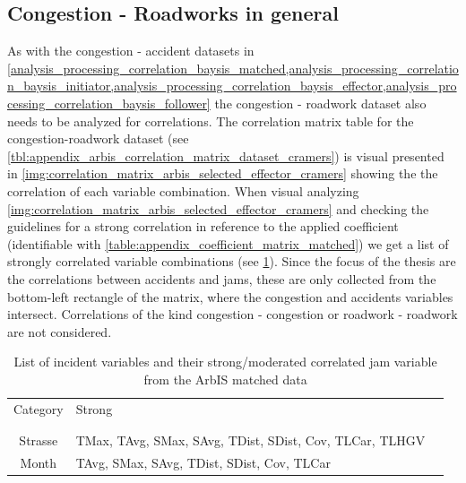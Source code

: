 \subsection{Congestion - Roadworks in general}
\label{analysis_processing_correlation_arbis_matched}
As with the congestion - accident datasets in \cref{analysis_processing_correlation_baysis_matched,analysis_processing_correlation_baysis_initiator,analysis_processing_correlation_baysis_effector,analysis_processing_correlation_baysis_follower} the congestion - roadwork dataset also needs to be analyzed for correlations. The correlation matrix table for the congestion-roadwork dataset (see \cref{tbl:appendix_arbis_correlation_matrix_dataset_cramers}) is visual presented in \cref{img:correlation_matrix_arbis_selected_effector_cramers} showing the the correlation of each variable combination. When visual analyzing \cref{img:correlation_matrix_arbis_selected_effector_cramers} and checking the guidelines for a strong correlation in reference to the applied coefficient (identifiable with \cref{table:appendix_coefficient_matrix_matched}) we get a list of strongly correlated variable combinations (see \cref{tbl:correlation_list_arbis_matched}). Since the focus of the thesis are the correlations between accidents and jams, these are only collected from the bottom-left rectangle of the matrix, where the congestion and accidents variables intersect. Correlations of the kind congestion - congestion or roadwork - roadwork are not considered.
\begin{table}[h!]
	\centering
	\begin{tabular}{c|l|l}  
		Category & Strong \\
		\\[-1em]
		\hline
		\\[-1em]
		Strasse & TMax, TAvg, SMax, SAvg, TDist, SDist, Cov, TLCar, TLHGV \\ 
 		Month & TAvg, SMax, SAvg, TDist, SDist, Cov, TLCar \\
	\end{tabular}
  \caption{List of incident variables and their strong/moderated correlated jam variable from the ArbIS matched data}
  \label{tbl:correlation_list_arbis_matched}
\end{table}
